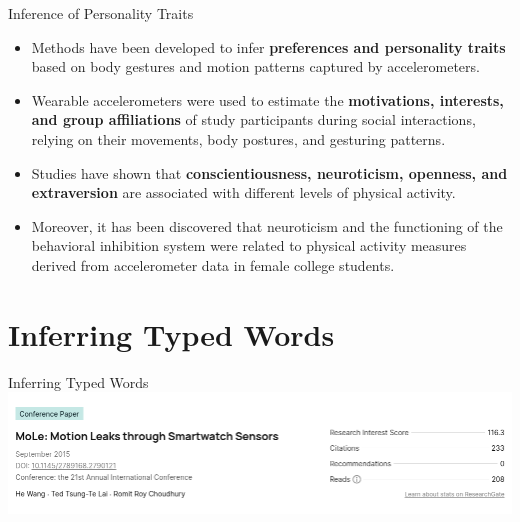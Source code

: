 \documentclass[ucs,9pt]{beamer}
\begin{document}
\begin{frame}{Inference of Personality Traits}
	\begin{itemize}
 		\item Methods have been developed to infer \textbf{preferences and
 		personality traits} based on body gestures and motion patterns
 		captured by accelerometers. 
 		\item Wearable accelerometers were
 		used to estimate the \textbf{motivations, interests, and group affiliations} of study participants during social interactions, relying
 		on their movements, body postures, and gesturing patterns.
 		
 		\item %
 		Studies have shown that \textbf{conscientiousness, neuroticism, openness, and
 		extraversion} are associated with different levels of physical
 		activity. %
 		\item Moreover, it has been discovered that neuroticism and the functioning of the
 		behavioral inhibition system were related to physical activity
 		measures derived from accelerometer data in female college
 		students.
	\end{itemize}
\end{frame}


\section{Inferring Typed Words}

\begin{frame}{Inferring Typed Words}
	\includegraphics[width=1\linewidth]{imgs/MoLePaper}
\end{frame}
\end{document}

